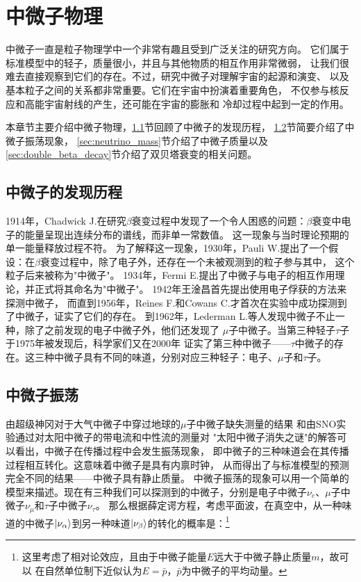 \chapter{中微子物理}

中微子一直是粒子物理学中一个非常有趣且受到广泛关注的研究方向。
它们属于标准模型中的轻子，质量很小，并且与其他物质的相互作用非常微弱，
让我们很难去直接观察到它们的存在。不过，研究中微子对理解宇宙的起源和演变、
以及基本粒子之间的关系都非常重要。它们在宇宙中扮演着重要角色，
不仅参与核反应和高能宇宙射线的产生，还可能在宇宙的膨胀和
冷却过程中起到一定的作用。


本章节主要介绍中微子物理，\ref{sec:neutrino_discovery}节回顾了中微子的发现历程，
\ref{sec:neutrino_oscillation}节简要介绍了中微子振荡现象，
\ref{sec:neutrino_mass}节介绍了中微子质量以及
\ref{sec:double_beta_decay}节介绍了双贝塔衰变的相关问题。

\section{中微子的发现历程}\label{sec:neutrino_discovery}

1914年，Chadwick J.在研究$\beta$衰变过程中发现了一个令人困惑的问题：$\beta$衰变中电子的能量呈现出连续分布的谱线，而非单一常数值。
这一现象与当时理论预期的单一能量释放过程不符。
为了解释这一现象，1930年，Pauli W.提出了一个假设：在$\beta$衰变过程中，除了电子外，还存在一个未被观测到的粒子参与其中，
这个粒子后来被称为"中微子"。
1934年，Fermi E.提出了中微子与电子的相互作用理论，并正式将其命名为"中微子"。
1942年王淦昌首先提出使用电子俘获的方法来探测中微子，
而直到1956年，Reines F.和Cowans C.才首次在实验中成功探测到了中微子，证实了它们的存在。\cite{science.124.3212.103}
到1962年，Lederman L.等人发现中微子不止一种，除了之前发现的电子中微子外，他们还发现了
$\mu$子中微子。当第三种轻子$\tau$子于1975年被发现后，科学家们又在2000年
证实了第三种中微子——$\tau$中微子的存在。这三种中微子具有不同的味道，分别对应三种轻子：电子、$\mu$子和$\tau$子。

\section{中微子振荡}\label{sec:neutrino_oscillation}

由超级神冈对于大气中微子中穿过地球的$\mu$子中微子缺失测量的结果
和由SNO实验通过对太阳中微子的带电流和中性流的测量对
"太阳中微子消失之谜"的解答可以看出，中微子在传播过程中会发生振荡现象，
即中微子的三种味道会在其传播过程相互转化。这意味着中微子是具有内禀时钟，
从而得出了与标准模型的预测完全不同的结果——中微子具有静止质量。
中微子振荡的现象可以用一个简单的模型来描述。现在有三种我们可以探测到的中微子，分别是电子中微子$\nu_e$、$\mu$子中微子$\nu_\mu$和$\tau$子中微子$\nu_\tau$。
那么根据薛定谔方程，考虑平面波，在真空中，从一种味道的中微子$\ket{\nu_\alpha}$到另一种味道$\ket{\nu_\beta}$的转化的概率是：\footnote{这里考虑了相对论效应，且由于中微子能量$E$远大于中微子静止质量$m$，故可以
在自然单位制下近似认为$E=\bar{p}$，$\bar{p}$为中微子的平均动量。}

